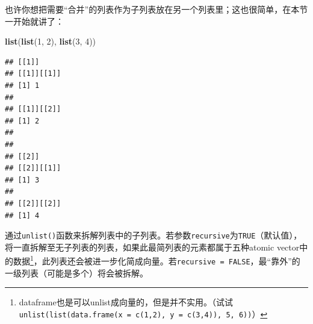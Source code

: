 \documentclass[]{book}
\newenvironment{Shaded}{\begin{snugshade}}{\end{snugshade}}
\newcommand{\DecValTok}[1]{\textcolor[rgb]{0.00,0.00,0.81}{#1}}
\newcommand{\KeywordTok}[1]{\textcolor[rgb]{0.13,0.29,0.53}{\textbf{#1}}}
\newcommand{\NormalTok}[1]{#1}
\let\rmarkdownfootnote\footnote%
\def\footnote{\protect\rmarkdownfootnote}
\begin{document}
也许你想把需要``合并''的列表作为子列表放在另一个列表里；这也很简单，在本节一开始就讲了：

\begin{Shaded}
\begin{Highlighting}[]
\KeywordTok{list}\NormalTok{(}\KeywordTok{list}\NormalTok{(}\DecValTok{1}\NormalTok{, }\DecValTok{2}\NormalTok{), }\KeywordTok{list}\NormalTok{(}\DecValTok{3}\NormalTok{, }\DecValTok{4}\NormalTok{))}
\end{Highlighting}
\end{Shaded}

\begin{verbatim}
## [[1]]
## [[1]][[1]]
## [1] 1
## 
## [[1]][[2]]
## [1] 2
## 
## 
## [[2]]
## [[2]][[1]]
## [1] 3
## 
## [[2]][[2]]
## [1] 4
\end{verbatim}

通过\texttt{unlist()}函数来拆解列表中的子列表。若参数\texttt{recursive}为\texttt{TRUE}（默认值），将一直拆解至无子列表的列表，如果此最简列表的元素都属于五种atomic vector中的数据\footnote{dataframe也是可以unlist成向量的，但是并不实用。（试试\texttt{unlist(list(data.frame(x\ =\ c(1,2),\ y\ =\ c(3,4)),\ 5,\ 6))}）}，此列表还会被进一步化简成向量。若\texttt{recursive\ =\ FALSE}，最``靠外''的一级列表（可能是多个）将会被拆解。
\end{document}
